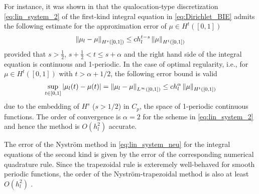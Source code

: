 For instance, it was shown in \cite{Sloan1992} that the qualocation-type discretization \eqref{eq:lin_system_2} of the first-kind integral equation in \eqref{eq:Dirichlet_BIE} admits the following estimate for the approximation error of $\mu \in H^t([0,1])$
\begin{align}\label{eq:BIE_error}
\left\| \mu_{l}-\mu \right\|_{H^s([0,1])} \leq c h_l^{t-s} \left\| \mu \right\|_{H^t([0,1])}
\end{align}
provided that $s>\frac{1}{2}$, $s+\frac{1}{2}< t \leq s+\alpha$ and the right hand side of the integral equation is continuous and 1-periodic.
In the case of optimal regularity, i.e., for $\mu \in H^t([0,1])$ with $t>\alpha+1/2$, the following error bound is valid
\begin{align}\label{eq:spat_order}
\sup_{t \in [0,1]}| \mu_l(t)-\mu(t) | = \left\| \mu_l-\mu \right\|_{L^{\infty}([0,1])} \leq c h_l^{\alpha} \left\| \mu \right\|_{H^t([0,1])}
\end{align}
due to the embedding of $H^s$ ($s>1/2$) in $C_p$, the space of 1-periodic continuous functions.
The order of convergence is $\alpha=2$ for the scheme in \eqref{eq:lin_system_2} and hence the method is $O(h_l^2)$ accurate.


The error of the Nystr\"om method in \eqref{eq:lin_system_neu} for the integral equations of the second kind is given by the error of the corresponding numerical quadrature rule.
Since the trapezoidal rule is exteremely well-behaved for smooth periodic functions, the order of the Nystr\"om-trapezoidal method is also at least $O(h_l^2)$ \cite{Atkinson1997}.

